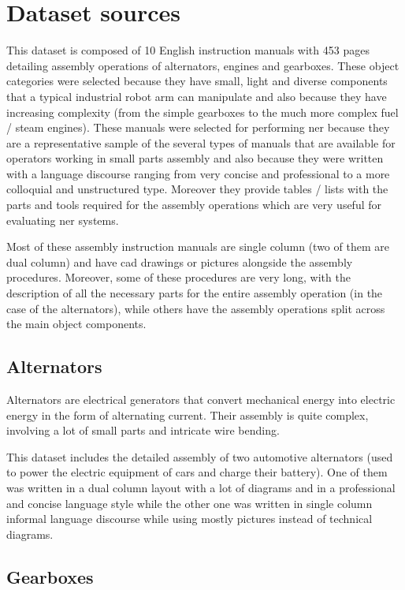 \section{Dataset sources}\label{sec:dataset-sources}

This dataset is composed of 10 English instruction manuals with 453 pages detailing assembly operations of alternators, engines and gearboxes. These object categories were selected because they have small, light and diverse components that a typical industrial robot arm can manipulate and also because they have increasing complexity (from the simple gearboxes to the much more complex fuel / steam engines). These manuals were selected for performing \gls{ner} because they are a representative sample of the several types of manuals that are available for operators working in small parts assembly and also because they were written with a language discourse ranging from very concise and professional to a more colloquial and unstructured type. Moreover they provide tables / lists with the parts and tools required for the assembly operations which are very useful for evaluating \gls{ner} systems.

Most of these assembly instruction manuals are single column (two of them are dual column) and have \gls{cad} drawings or pictures alongside the assembly procedures. Moreover, some of these procedures are very long, with the description of all the necessary parts for the entire assembly operation (in the case of the alternators), while others have the assembly operations split across the main object components.


\subsection{Alternators}

Alternators are electrical generators that convert mechanical energy into electric energy in the form of alternating current. Their assembly is quite complex, involving a lot of small parts and intricate wire bending.

This dataset includes the detailed assembly of two automotive alternators (used to power the electric equipment of cars and charge their battery). One of them was written in a dual column layout with a lot of diagrams and in a professional and concise language style while the other one was written in single column informal language discourse while using mostly pictures instead of technical diagrams.


\subsection{Gearboxes}

